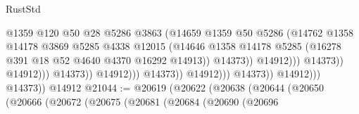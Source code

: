 \begin{lexlean}{RustStd}
\begin{coremodule}
                                                      @1359
                                                      @120
                                                      @50
                                                      @28
                                                      @5286
                                                      @3863
                                                      (@14659
                                                        @1359
                                                        @50
                                                        @5286
                                                        (@14762
                                                          @1358
                                                          @14178
                                                          @3869
                                                          @5285
                                                          @4338
                                                          @12015
                                                          (@14646
                                                            @1358
                                                            @14178
                                                            @5285
                                                            (@16278
                                                              @391
                                                              @18
                                                              @52
                                                              @4640
                                                              @4370
                                                              @16292
                                                              @14913))
                                                          @14373))
                                                      @14912)))
                                                @14373))
                                            @14912)))
                                      @14373))
                                  @14912)))
                            @14373))
                        @14912)))
                  @14373))
              @14912)))
        @14373))
    @14912
@21044 := @20619
    (@20622
      (@20638
        (@20644
          (@20650
            (@20666
              (@20672
                (@20675
                  (@20681
                    (@20684
                      (@20690
                        (@20696

\end{coremodule}
\end{lexlean}

